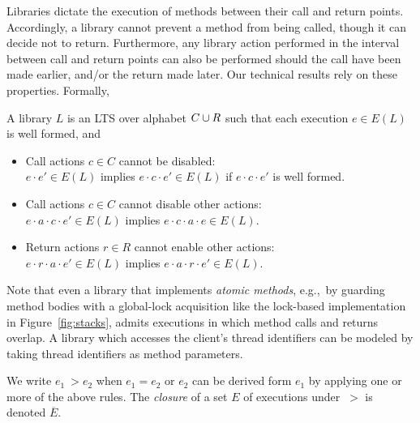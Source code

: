 
Libraries dictate the execution of methods between their call and return
points. Accordingly, a library cannot prevent a method from being called,
though it can decide not to return. Furthermore, any library action performed
in the interval between call and return points can also be performed should the
call have been made earlier, and/or the return made later. Our technical
results rely on these properties. Formally, 

\begin{definition}
A library $L$ is an LTS over
alphabet $C \cup R$ such that each execution $e \in E(L)$ is well formed, and
\begin{itemize}

  \item Call actions $c \in C$ cannot be disabled: \\
  $e \cdot e' \in E(L)$ implies $e \cdot c \cdot e' \in E(L)$
  if $e \cdot c \cdot e'$ is well formed.
  
  \item Call actions $c \in C$ cannot disable other actions: \\
  $e \cdot a \cdot c \cdot e' \in E(L)$ implies $e \cdot c \cdot a \cdot e \in E(L)$.
  
  \item Return actions $r \in R$ cannot enable other actions: \\
  $e \cdot r \cdot a \cdot e' \in E(L)$ implies $e \cdot a \cdot r \cdot e' \in E(L)$.
  
\end{itemize}
\end{definition}

Note that even a library that implements
\emph{atomic methods}, e.g.,~by guarding method bodies with a global-lock
acquisition like the lock-based implementation in Figure~\ref{fig:stacks}, 
admits executions in which method calls and returns overlap.
A library which accesses the client's thread identifiers can be modeled by 
taking thread identifiers as method parameters.

We write $e_1 ~> e_2$ when $e_1=e_2$ or $e_2$ can be derived form $e_1$ by applying one or
more of the above rules. The \emph{closure} of a set $E$ of executions under
$~>$ is denoted $\overline{E}$. 


